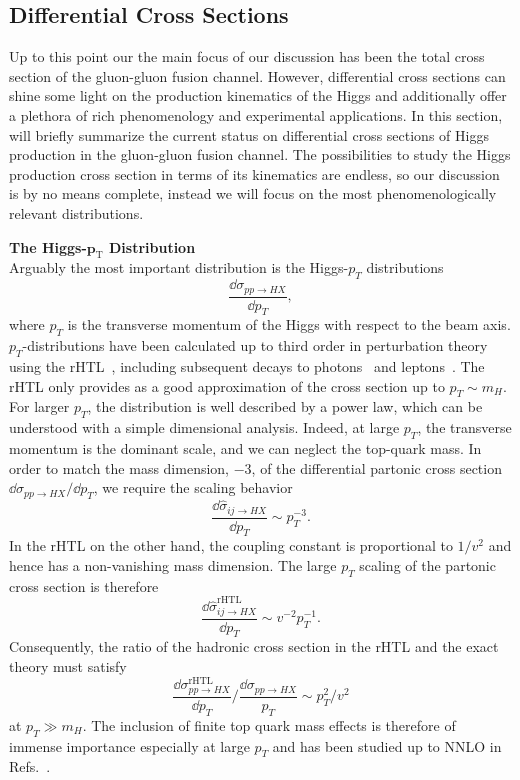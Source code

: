 \subsection{Differential Cross Sections} \label{subsec:4:differential_cross_sections}
Up to this point our the main focus of our discussion has been the total cross section of the gluon-gluon fusion channel. However, differential cross sections can shine some light on the production kinematics of the Higgs and additionally offer a plethora of rich phenomenology and experimental applications. In this section, will briefly summarize the current status on differential cross sections of Higgs production in the gluon-gluon fusion channel. The possibilities to study the Higgs production cross section in terms of its kinematics are endless, so our discussion is by no means complete, instead we will focus on the most phenomenologically relevant distributions.

\textbf{The Higgs-$\mathbf{p}_\mathrm{T}$ Distribution}\\
Arguably the most important distribution is the Higgs-$p_T$ distributions
\begin{equation}
\frac{\dd \sigma_{pp \rightarrow HX}}{\dd  p_T},
\end{equation}
where $p_T$ is the transverse momentum of the Higgs with respect to the beam axis. $p_T$-distributions have been calculated up to third order in perturbation theory using the \acs{rHTL}~\cite{Chen:2014gva,Becker:2020rjp}, including subsequent decays to photons~\cite{Chen:2021isd} and leptons~\cite{Chen:2019zel}. The \acs{rHTL} only provides as a good approximation of the cross section up to $p_T \sim m_H$. For larger $p_T$, the distribution is well described by a power law, which can be understood with a simple dimensional analysis. Indeed, at large $p_T$, the transverse momentum is the dominant scale, and we can neglect the top-quark mass. In order to match the mass dimension, $-3$, of the differential partonic cross section $\dd \sigma_{pp \rightarrow HX}/\dd p_T$, we require the scaling behavior
\begin{equation}
\frac{\dd \hat{\sigma}_{ij \rightarrow HX}}{\dd p_T} \sim  p_T^{-3}.
\end{equation}
In the \acs{rHTL} on the other hand, the coupling constant is proportional to $1/v^2$ and hence has a non-vanishing mass dimension. The large $p_T$ scaling of the partonic cross section is therefore
\begin{equation}
\frac{\dd \hat{\sigma}_{ij \rightarrow HX}^\mathrm{rHTL}}{\dd p_T} \sim v^{-2}p_T^{-1}.
\end{equation}
Consequently, the ratio of the hadronic cross section in the \acs{rHTL} and the exact theory must satisfy
\begin{equation}
\frac{\dd \sigma_{pp \rightarrow HX}^{\mathrm{rHTL}}}{\dd p_T} \bigg / \frac{\dd \sigma_{pp \rightarrow HX}}{ p_T} \sim p_T^2/v^2
\label{eq:4:dSig_rHTL/dSig}
\end{equation}
at $p_T \gg m_H$. The inclusion of finite top quark mass effects is therefore of immense importance especially at large $p_T$ and has been studied up to \acs{NNLO} in Refs.~\cite{Grazzini:2013mca, Buschmann:2014sia, Jones:2018hbb}.

